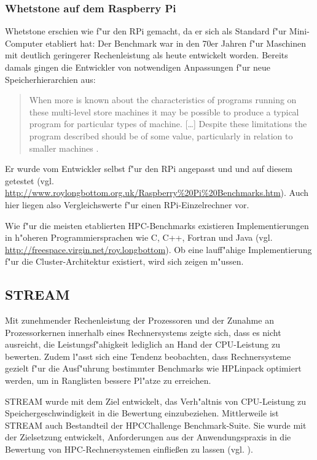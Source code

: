 \subsubsection{Whetstone auf dem Raspberry Pi}\label{Whetstone-RPi}

Whetstone erschien wie f"ur den RPi gemacht, da er sich als Standard f"ur Mini-Computer etabliert hat: Der Benchmark war in den 70er Jahren f"ur Maschinen mit deutlich geringerer Rechenleistung als heute entwickelt worden. Bereits damals gingen die Entwickler von notwendigen Anpassungen f"ur neue Speicherhierarchien aus: 
\begin{quote}
\onehalfspacing
When more is known about the characteristics of programs running on these multi-level store machines it may be possible to produce a typical program for particular types of machine. [\dots] Despite these limitations the program described should be of some value, particularly in relation to smaller machines \cite{cur76}. 
\end{quote}
Er wurde vom Entwickler selbst f"ur den RPi angepasst und und auf diesem getestet (vgl. \url{http://www.roylongbottom.org.uk/Raspberry\%20Pi\%20Benchmarks.htm}). Auch hier liegen also Vergleichswerte f"ur einen RPi-Einzelrechner vor. 

Wie f"ur die meisten etablierten HPC-Benchmarks existieren Implementierungen in h"oheren Programmiersprachen wie C, C++, Fortran und Java (vgl. \url{http://freespace.virgin.net/roy.longbottom}). Ob eine lauff"ahige Implementierung f"ur die Cluster-Archi\-tektur existiert, wird sich zeigen m"ussen. 

\subsection{STREAM}\label{STREAM}

Mit zunehmender Rechenleistung der Prozessoren und der Zunahme an Prozessorkernen innerhalb eines Rechnersystems zeigte sich, dass es nicht ausreicht, die Leistungsf"ahigkeit lediglich an Hand der CPU-Leistung zu bewerten. Zudem l"asst sich eine Tendenz beobachten, dass Rechnersysteme gezielt f"ur die Ausf"uhrung bestimmter Benchmarks wie HPLinpack optimiert werden, um in Ranglisten bessere Pl"atze zu erreichen. 

STREAM wurde mit dem Ziel entwickelt, das Verh"altnis von CPU-Leistung zu Speichergeschwindigkeit in die Bewertung einzubeziehen. Mittlerweile ist STREAM auch Bestandteil der HPCChallenge Benchmark-Suite. Sie wurde mit der Zielsetzung entwickelt, Anforderungen aus der Anwendungspraxis in die Bewertung von HPC-Rechnersystemen einflie\ss en zu lassen (vgl. \cite{lus05}).

